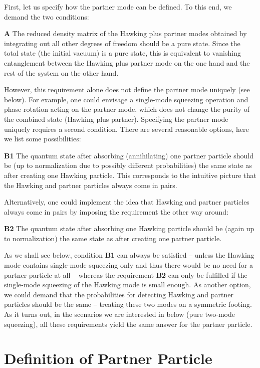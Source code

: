 \documentclass[aps,prd,showpacs,amssymb,nofootinbib,twocolumn]{revtex4}
\begin{document}
First, let us specify how the partner mode can be defined.
%
To this end, we demand the two conditions: 

{\bf A}
The reduced density matrix of the Hawking plus partner modes obtained by 
integrating out all other degrees of freedom should be a pure state.
%
Since the total state (the initial vacuum) is a pure state, this is equivalent 
to vanishing entanglement between the Hawking plus partner mode 
on the one hand and the rest of the system on the other hand. 

However, this requirement alone does not define the partner mode uniquely 
(see below).
%
For example, one could envisage a single-mode squeezing operation
and phase rotation acting on the partner mode, which does not change 
the purity of the combined state (Hawking plus partner). 
%
Specifying the partner mode uniquely requires a second condition. 
%
There are several reasonable options, here we list some possibilities:  

{\bf B1}
The quantum state after absorbing (annihilating) one partner particle 
should be (up to normalization due to possibly different probabilities)
the same state as after creating one Hawking particle.
%
This corresponds to the intuitive picture that the Hawking and partner 
particles always come in pairs. 

Alternatively, one could implement the idea that  Hawking and partner 
particles always come in pairs by imposing the requirement the 
other way around: 

{\bf B2}
The quantum state after absorbing one Hawking particle should be 
(again up to normalization)
the same state as after creating one partner particle.

As we shall see below, condition {\bf B1} can always be satisfied -- 
unless the Hawking mode contains single-mode squeezing only and 
thus there would be no need for a partner particle at all -- 
whereas the requirement {\bf B2} can only be fulfilled if the 
single-mode squeezing of the Hawking mode is small enough. 
%
As another option, we could demand that the probabilities for detecting 
Hawking and partner particles should be the same -- treating these 
two modes on a symmetric footing. 
%
As it turns out, in the scenarios we are interested in below 
(pure two-mode squeezing), all these requirements yield the same 
answer for the partner particle. 

\section{Definition of Partner Particle}\label{Definition-Partner}
\end{document}
